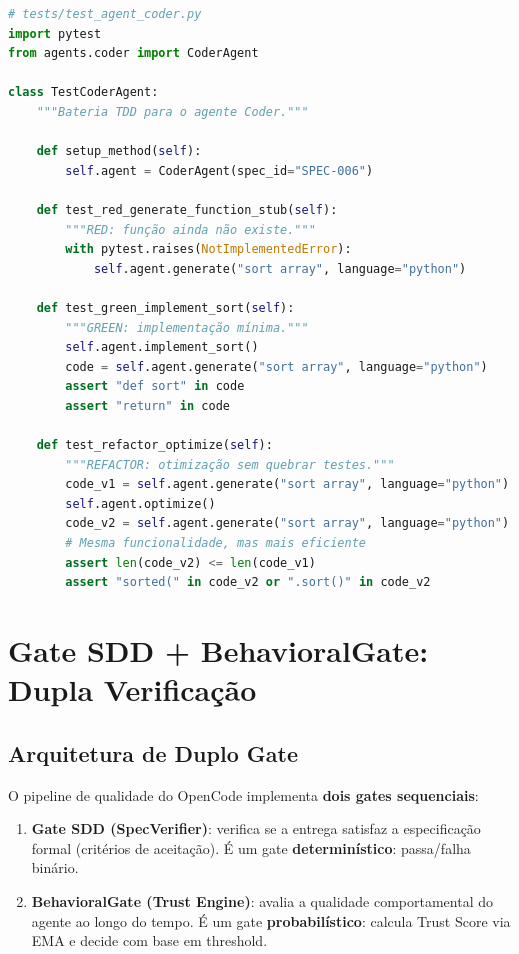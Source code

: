 \begin{lstlisting}[language=Python, caption={TDD: teste primeiro, implemente depois}]
# tests/test_agent_coder.py
import pytest
from agents.coder import CoderAgent

class TestCoderAgent:
    """Bateria TDD para o agente Coder."""
    
    def setup_method(self):
        self.agent = CoderAgent(spec_id="SPEC-006")
    
    def test_red_generate_function_stub(self):
        """RED: função ainda não existe."""
        with pytest.raises(NotImplementedError):
            self.agent.generate("sort array", language="python")
    
    def test_green_implement_sort(self):
        """GREEN: implementação mínima."""
        self.agent.implement_sort()
        code = self.agent.generate("sort array", language="python")
        assert "def sort" in code
        assert "return" in code
    
    def test_refactor_optimize(self):
        """REFACTOR: otimização sem quebrar testes."""
        code_v1 = self.agent.generate("sort array", language="python")
        self.agent.optimize()
        code_v2 = self.agent.generate("sort array", language="python")
        # Mesma funcionalidade, mas mais eficiente
        assert len(code_v2) <= len(code_v1)
        assert "sorted(" in code_v2 or ".sort()" in code_v2
\end{lstlisting}

\section{Gate SDD + BehavioralGate: Dupla Verificação}

\subsection{Arquitetura de Duplo Gate}

O pipeline de qualidade do OpenCode implementa \textbf{dois gates sequenciais}:

\begin{enumerate}
    \item \textbf{Gate SDD (SpecVerifier)}: verifica se a entrega satisfaz a especificação formal (critérios de aceitação). É um gate \textbf{determinístico}: passa/falha binário.
    
    \item \textbf{BehavioralGate (Trust Engine)}: avalia a qualidade comportamental do agente ao longo do tempo. É um gate \textbf{probabilístico}: calcula Trust Score via EMA e decide com base em threshold.
\end{enumerate}

